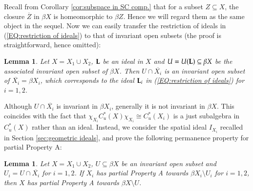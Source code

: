 \documentclass[12pt, a4paper]{amsart}
\numberwithin{equation}{section}
\newtheorem{lem}[thm]{Lemma}
\theoremstyle{definition}
\theoremstyle{remark}
\def\L{\mathcal{L}}
\def\Nd{\mathcal{N}}
\def\L{{\bf L}}
\begin{document}
Recall from Corollary \ref{cor:subspace in SC comp.} that for a subset $Z \subseteq X$, the closure $\overline{Z}$ in $\beta X$ is homeomorphic to $\beta Z$. Hence we will regard them as the same object in the sequel. Now we can easily transfer the restriction of ideals in (\ref{EQ:restriction of ideals}) to that of invariant open subsets (the proof is straightforward, hence omitted):

\begin{lem}\label{lem:transfer ideals to open subsets}
Let $X = X_1 \cup X_2$, $\L$ be an ideal in $X$ and $U = U(\L) \subseteq \beta X$ be the associated invariant open subset of $\beta X$. Then $U \cap \overline{X_i}$ is an invariant open subset of $\overline{X_i} = \beta X_i$, which corresponds to the ideal $\L_i$ in (\ref{EQ:restriction of ideals}) for $i=1,2$.
\end{lem}

Although $U \cap \overline{X_i}$ is invariant in $\beta X_i$, generally it is not invariant in $\beta X$. This coincides with the fact that $\chi_{X_i} C^*_u(X) \chi_{X_i} \cong C^*_u(X_i)$ is a just subalgebra in $C^*_u(X)$ rather than an ideal. Instead, we consider the spatial ideal $I_{X_i}$ recalled in Section \ref{sec:geometric ideals},
%
and prove the following permanence property for partial Property A: 

\begin{lem}\label{lem:permanence for partial A}
Let $X = X_1 \cup X_2$, $U \subseteq \beta X$ be an invariant open subset and $U_i=U \cap \overline{X_i}$ for $i=1,2$. If $X_i$ has partial Property A towards $\beta X_i \setminus U_i$ for $i=1,2$, then $X$ has partial Property A towards $\beta X \setminus U$.
\end{lem}
\end{document}
